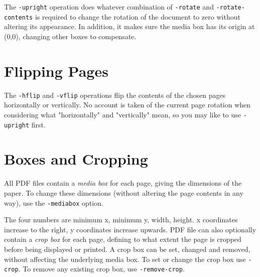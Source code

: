 \documentclass{book}
\begin{document}
  \label{upright}
   \noindent The \texttt{-upright} operation does whatever combination of
\texttt{-rotate} and \texttt{-rotate-contents} is required to change the
rotation of the document to zero without altering its appearance. In addition, it makes sure the media box has its origin at (0,0), changing other boxes to compensate.

  \section{Flipping Pages}
  The \texttt{-hflip} and \texttt{-vflip} operations flip the contents of the
chosen pages horizontally or vertically. No account is taken of the current
page rotation when considering what "horizontally" and "vertically" mean, so you may like to use \texttt{-upright} first.

\noindent{}
  \section{Boxes and Cropping}
  All PDF files contain a \textit{media box} for each page, giving the
dimensions of the paper. To change these dimensions (without altering the page
contents in any way), use the \texttt{-mediabox} option.

\noindent{}

  \noindent The four numbers are minimum x, minimum y, width, height. x
coordinates increase to the right, y coordinates increase upwards.
  PDF file can also optionally contain a \textit{crop box} for each page,
defining to what extent the page is cropped before being displayed or printed.
A crop box can be set, changed and removed, without affecting the underlying
media box. To set or change the crop box use \texttt{-crop}. To remove any
existing crop box, use \texttt{-remove-crop}.
\end{document}

